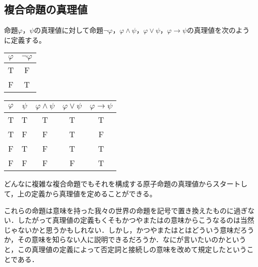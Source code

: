 \documentclass[10pt,b5paper,papersize,dvipdfmx]{jsbook}
\begin{document}
\subsection{複合命題の真理値}
命題$\varphi，\psi$の真理値に対して命題$\lnot\varphi，\varphi\land\psi，\varphi\lor\psi，\varphi\to\psi$の真理値を次のように定義する。\par
\begin{table}[H]
\begin{minipage}[t]{.45\textwidth}
\begin{center}
\begin{tabular}{|c||c|}\hline
$\varphi$&$\lnot\varphi$ \\ \hline \hline
T&F \\ \hline
F&T \\ \hline
\end{tabular}
\end{center}
\end{minipage}
\hfill
\begin{minipage}[t]{.45\textwidth}
\begin{center}
\begin{tabular}{|c|c||c|c|c|}\hline
$\varphi$&$\psi$&$\varphi\land\psi$&$\varphi\lor\psi$&$\varphi\to\psi$ \\ \hline \hline
T&T&T&T&T \\ \hline
T&F&F&T&F \\ \hline
F&T&F&T&T \\ \hline
F&F&F&F&T \\ \hline
\end{tabular}
\end{center}
\end{minipage}
\end{table}
どんなに複雑な複合命題でもそれを構成する原子命題の真理値からスタートして，上の定義から真理値を定めることができる。\par
これらの命題は意味を持った我々の世界の命題を記号で置き換えたものに過ぎない．したがって真理値の定義もくそもかつやまたはの意味からこうなるのは当然じゃないかと思うかもしれない．しかし，かつやまたはとはどういう意味だろうか，その意味を知らない人に説明できるだろうか．なにが言いたいのかというと，この真理値の定義によって否定詞と接続しの意味を改めて規定したということである．
\end{document}
